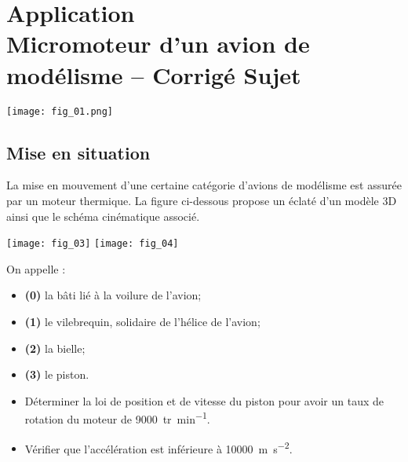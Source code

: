 \chapter*{Application  \\ 
Micromoteur d'un avion de modélisme -- \ifprof Corrigé \else Sujet \fi}

\iflivret {} \else
\ifprof  {} \else \fi
\fi

\setcounter{question}{0}

\marginnote[1cm]{
}


\begin{marginfigure}
\texttt{[image: fig\_01.png]}
\end{marginfigure}

\section*{Mise en situation}
La mise en mouvement d'une certaine catégorie d'avions de modélisme est assurée par un moteur thermique.   La figure ci-dessous propose un éclaté d'un modèle 3D ainsi que le schéma cinématique associé. 

\begin{marginfigure}
\centering
\texttt{[image: fig\_03]}
\texttt{[image: fig\_04]}
\end{marginfigure}

On appelle : 
\begin{itemize}
\item \textbf{(0)} la bâti lié à la voilure de l'avion;
\item \textbf{(1)} le vilebrequin, solidaire de l'hélice de l'avion;
\item \textbf{(2)} la bielle;
\item \textbf{(3)} le piston.
\end{itemize}

\begin{obj}
\begin{itemize}
\item Déterminer la loi de position et de vitesse du piston pour avoir un taux de rotation du moteur de \SI{9000}{tr.min^{-1}}.
\item Vérifier que l'accélération est inférieure à \SI{10000}{m.s^{-2}}.
\end{itemize}
\end{obj}


